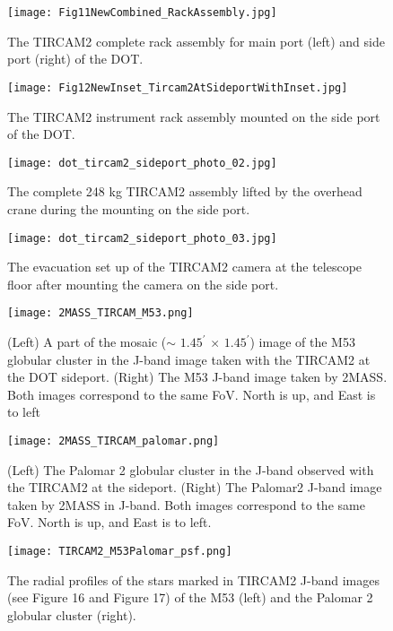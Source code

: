 \documentclass{jaa}
\begin{document}
\begin{figure}
\texttt{[image: Fig11NewCombined\_RackAssembly.jpg]}
\caption{The TIRCAM2 complete rack assembly for main port (left) and side port (right) of the DOT.}
\label{fig11}
\end{figure}

\begin{figure}[!h]
\texttt{[image: Fig12NewInset\_Tircam2AtSideportWithInset.jpg]}
\caption{The TIRCAM2 instrument rack assembly mounted on the side port of the DOT.}
\label{fig12}
\end{figure}

\begin{figure}[!h]
\texttt{[image: dot\_tircam2\_sideport\_photo\_02.jpg]}
\caption{The complete 248 kg TIRCAM2 assembly lifted by the overhead crane during the mounting on the side port.}
\label{fig13}
\end{figure}

\begin{figure}[!h]
\texttt{[image: dot\_tircam2\_sideport\_photo\_03.jpg]}
\caption{The evacuation set up of the TIRCAM2 camera at the telescope floor
after mounting the camera on the side port.}
\label{fig14}
\end{figure}

\begin{figure}[!h]
\texttt{[image: 2MASS\_TIRCAM\_M53.png]}
\caption{(Left) A part of the mosaic ($\sim$ $1.45^{\prime}$ $\times$ $1.45^{\prime}$) image of the M53 globular cluster in the J-band image taken with the TIRCAM2 at the DOT sideport. (Right) The M53 J-band image taken by 2MASS. Both images correspond to the same FoV. North is up, and East is to left}
\label{fig15}
\end{figure}

\begin{figure}[!h]
\texttt{[image: 2MASS\_TIRCAM\_palomar.png]}
\caption{(Left) The Palomar 2 globular cluster in the J-band observed with the TIRCAM2 at the sideport. (Right) The Palomar2 J-band image taken by 2MASS in J-band. Both images correspond to the same FoV. North is up, and East is to left.}
\label{fig16}
\end{figure}

\begin{figure}[!h]
\texttt{[image: TIRCAM2\_M53Palomar\_psf.png]}
\caption{The radial profiles of the stars marked in TIRCAM2 J-band images (see Figure 16 and Figure 17) of the M53 (left) and the Palomar 2 globular cluster (right).}
\label{fig17}
\end{figure}
\end{document}
